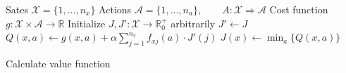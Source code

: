 \documentclass{article}
\begin{document}
\begin{preview}
    \begin{algorithm}[H]
        \begin{algorithmic}
        \Require
        \Statex Sates $\mathcal{X} = \{1, \dots, n_x\}$
        \Statex Actions $\mathcal{A} = \{1, \dots, n_a\},\qquad A: \mathcal{X} \Rightarrow \mathcal{A}$
        \Statex Cost function $g: \mathcal{X} \times \mathcal{A} \rightarrow \mathbb{R}$
            \State Initialize $J, J': \mathcal{X} \rightarrow \mathbb{R}_0^+$ arbitrarily
                \State $J' \gets J$
                        \State $Q(x, a) \gets g(x, a) + \alpha \sum_{j=1}^{n_x} f_{xj}(a) \cdot J'(j)$
                    \EndFor
                \EndFor
                    \State $J(x) \gets \min_a \{Q(x, a)\}$
                \EndFor
            \EndWhile
        \EndProcedure
        \end{algorithmic}
    \caption{Calculate value function}
    \label{alg:value-iteration}
    \end{algorithm}
\end{preview}
\end{document}
